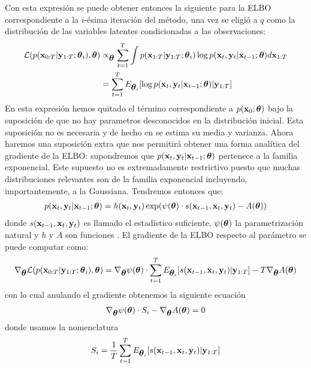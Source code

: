 Con esta expresión se puede obtener entonces la siguiente para la ELBO correspondiente a la $i$-ésima iteración del método, una vez se eligió a $q$ como la distribución de las variables latentes condicionadas a las observaciones:
\begin{align}
    \mathcal{L}(p(\mathbf{x}_{0:T} | \mathbf{y}_{1:T} ; \mbox{\boldmath$ \theta $}_i), \mbox{\boldmath$ \theta $}) &\propto_{\mbox{\boldmath$ \theta $}} \sum_{t=1}^T \int p(\mathbf{x}_{1:T} | \mathbf{y}_{1:T} ; \mbox{\boldmath$ \theta $}_i) \log p(\mathbf{x}_t, \mathbf{y}_t | \mathbf{x}_{t-1} ; \mbox{\boldmath$ \theta $}) d\mathbf{x}_{1:T} \\
    &= \sum_{t=1}^T E_{\mbox{\boldmath$ \theta $}_i} [\log p(\mathbf{x}_t, \mathbf{y}_t | \mathbf{x}_{t-1} ; \mbox{\boldmath$ \theta $}) | \mathbf{y}_{1:T}]
\end{align}
En esta expresión hemos quitado el término correspondiente a $p(\mathbf{x}_0 ; \mbox{\boldmath$ \theta $})$ bajo la suposición de que no hay parametros desconocidos en la distribución inicial. Esta suposición no es necesaria y de hecho en \cite{Dreano2017} se estima su media y varianza. Ahora haremos una suposición extra que nos permitirá obtener una forma analítica del gradiente de la ELBO: supondremos que $p(\mathbf{x}_t, \mathbf{y}_t | \mathbf{x}_{t-1} ; \mbox{\boldmath$ \theta $})$ pertenece a la familia exponencial. Este supuesto no es extremadamente restrictivo puesto que muchas distribuciones relevantes son de la familia exponencial incluyendo, importantemente, a la Gaussiana. Tendremos entonces que:
\begin{align*}
    p(\mathbf{x}_t, \mathbf{y}_t | \mathbf{x}_{t-1} ; \mbox{\boldmath$ \theta $}) = h(\mathbf{x}_t, \mathbf{y}_t) \exp(\psi(\mbox{\boldmath$ \theta $})\cdot s(\mathbf{x}_{t-1}, \mathbf{x}_t, \mathbf{y}_t) - A(\mbox{\boldmath$ \theta $}))
\end{align*}
donde $s(\mathbf{x}_{t-1}, \mathbf{x}_t, \mathbf{y}_t)$ es llamado el estadístico suficiente, $\psi(\mbox{\boldmath$ \theta $})$ la parametrización natural y $h$ y $A$ son funciones \citep{Wasserman2004}. El gradiente de la ELBO respecto al parámetro se puede computar como:
\begin{align}
    \nabla_{\mbox{\boldmath$ \theta $}} \mathcal{L}(p(\mathbf{x}_{0:T} | \mathbf{y}_{1:T} ; \mbox{\boldmath$ \theta $}_i), \mbox{\boldmath$ \theta $}) = \nabla_{\mbox{\boldmath$ \theta $}} \psi(\mbox{\boldmath$ \theta $}) \cdot \sum_{t=1}^T E_{\mbox{\boldmath$ \theta $}_i} [s(\mathbf{x}_{t-1}, \mathbf{x}_t, \mathbf{y}_t) | \mathbf{y}_{1:T}] - T\nabla_{\mbox{\boldmath$ \theta $}}A(\mbox{\boldmath$ \theta $})
\end{align}
con lo cual anulando el gradiente obtenemos la siguiente ecuación
\begin{align} \label{eq:null_elbo_grad}
    \nabla_{\mbox{\boldmath$ \theta $}} \psi(\mbox{\boldmath$ \theta $}) \cdot S_i - \nabla_{\mbox{\boldmath$ \theta $}}A(\mbox{\boldmath$ \theta $}) = 0
\end{align}
donde usamos la nomenclatura
\begin{align} \label{eq:S_def}
    S_i = \frac{1}{T}\sum_{t=1}^T E_{\mbox{\boldmath$ \theta $}_i} [s(\mathbf{x}_{t-1}, \mathbf{x}_t, \mathbf{y}_t) | \mathbf{y}_{1:T}]
\end{align}
